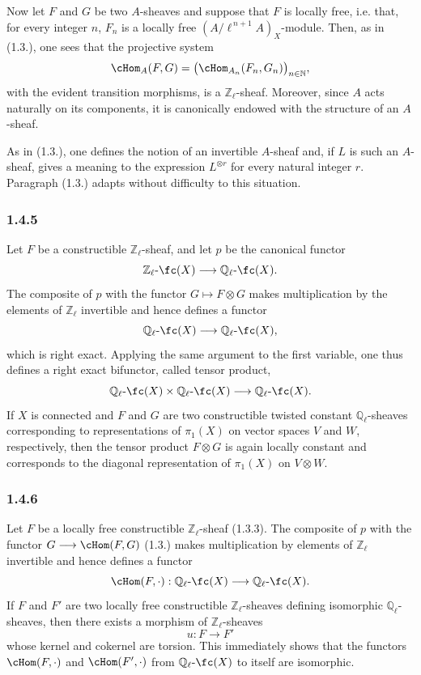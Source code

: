 Now let \(F\) and \(G\) be two \(A\)-sheaves and suppose that \(F\) is locally free, i.e. that, for every integer \(n\), \(F_n\) is a locally free \((A/\ell^{\,n+1}A)_X\)-module. Then, as in (1.3.), one sees that the projective system
\[
\cHom_A(F,G)=\bigl(\cHom_{A_n}(F_n,G_n)\bigr)_{n\in\mathbb N},
\]
with the evident transition morphisms, is a \(\mathbb Z_\ell\)-sheaf. Moreover, since \(A\) acts naturally on its components, it is canonically endowed with the structure of an \(A\)-sheaf.

As in (1.3.), one defines the notion of an invertible \(A\)-sheaf and, if \(L\) is such an \(A\)-sheaf, gives a meaning to the expression \(L^{\otimes r}\) for every natural integer \(r\). Paragraph (1.3.) adapts without difficulty to this situation.

\subsubsection*{1.4.5}
Let \(F\) be a constructible \(\mathbb Z_\ell\)-sheaf, and let \(p\) be the canonical functor
\[
\mathbb Z_\ell\text{-}\fc(X)\longrightarrow \mathbb Q_\ell\text{-}\fc(X).
\]
The composite of \(p\) with the functor \(G\mapsto F\otimes G\) makes multiplication by the elements of \(\mathbb Z_\ell\) invertible and hence defines a functor
\[
\mathbb Q_\ell\text{-}\fc(X)\longrightarrow \mathbb Q_\ell\text{-}\fc(X),
\]
which is right exact. Applying the same argument to the first variable, one thus defines a right exact bifunctor, called tensor product,
\[
\mathbb Q_\ell\text{-}\fc(X)\times \mathbb Q_\ell\text{-}\fc(X)
\longrightarrow \mathbb Q_\ell\text{-}\fc(X).
\]
If \(X\) is connected and \(F\) and \(G\) are two constructible twisted constant \(\mathbb Q_\ell\)-sheaves corresponding to representations of \(\pi_1(X)\) on vector spaces \(V\) and \(W\), respectively, then the tensor product \(F\otimes G\) is again locally constant and corresponds to the diagonal representation of \(\pi_1(X)\) on \(V\otimes W\).

\subsubsection*{1.4.6}
Let \(F\) be a locally free constructible \(\mathbb Z_\ell\)-sheaf (1.3.3). The composite of \(p\) with the functor \(G\longrightarrow\cHom(F,G)\) (1.3.) makes multiplication by elements of \(\mathbb Z_\ell\) invertible and hence defines a functor
\[
\cHom(F,\cdot):\mathbb Q_\ell\text{-}\fc(X)\longrightarrow \mathbb Q_\ell\text{-}\fc(X).
\]
If \(F\) and \(F'\) are two locally free constructible \(\mathbb Z_\ell\)-sheaves defining isomorphic \(\mathbb Q_\ell\)-sheaves, then there exists a morphism of \(\mathbb Z_\ell\)-sheaves
\[
u:F\longrightarrow F'
\]
whose kernel and cokernel are torsion. This immediately shows that the functors \(\cHom(F,\cdot)\) and \(\cHom(F',\cdot)\) from \(\mathbb Q_\ell\text{-}\fc(X)\) to itself are isomorphic.

